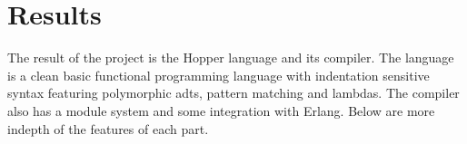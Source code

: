 \chapter{Results}

 The result of the project is the Hopper language and its compiler. The language is a clean basic functional programming language with indentation sensitive syntax featuring polymorphic \glspl{adt}, pattern matching and lambdas. The compiler also has a module system and some integration with Erlang. Below are more indepth of the features of each part. 





